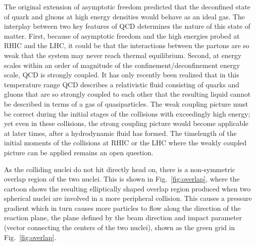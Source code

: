 The original extension of asymptotic freedom predicted that the deconfined state of quark and gluons at high energy densities would behave as an ideal gas. The interplay between two key features of QCD determines the nature of this state of matter. First, because of asymptotic freedom and the high energies probed at RHIC and the LHC, it could be that the interactions between the partons are so weak that the system may never reach thermal equilibrium. Second, at energy scales within an order of magnitude of the confinement/deconfinement energy scale, QCD is strongly coupled. It has only recently been realized that in this temperature range QCD describes a relativistic fluid consisting of quarks and gluons that are so strongly coupled to each other that the resulting liquid cannot be described in terms of a gas of quasiparticles. The weak coupling picture must be correct during the initial stages of the collisions with exceedingly high energy; yet even in these collisions, the strong coupling picture would become applicable at later times, after a hydrodynamic fluid has formed. The timelength of the initial moments of the collisions at RHIC or the LHC where the weakly coupled picture can be applied remains an open question.


As the colliding nuclei do not hit directly head on, there is a non-symmetric overlap region of the two nuclei. This is shown in Fig.~\ref{fig:overlap}, where the cartoon shows the resulting elliptically shaped overlap region produced when two spherical nuclei are involved in a more peripheral collision. This causes a pressure gradient which in turn causes more particles to flow along the direction of the reaction plane, the plane defined by the beam direction and impact parameter (vector connecting the centers of the two nuclei), shown as the green grid in Fig.~\ref{fig:overlap}.

